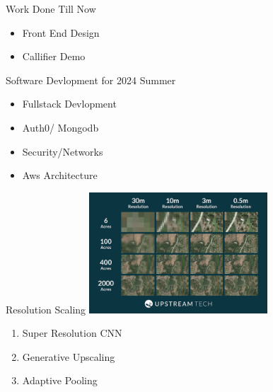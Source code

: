 

\begin{frame}{Work Done Till Now}
    \begin{itemize}
        \item Front End Design 
        \item Callifier Demo 
    \end{itemize}
\end{frame}


\begin{frame}{Software Devlopment for 2024 Summer}
    \begin{itemize}
        \item Fullstack Devlopment
        \item Auth0/ Mongodb
        \item Security/Networks
        \item Aws Architecture
    \end{itemize}
\end{frame}



\begin{frame}{Resolution Scaling}
    \includegraphics[height=0.5\textheight,width=0.5\textwidth,keepaspectratio]{images/mm_ml/Resolutions.png}
    \begin{enumerate}
        \item Super Resolution CNN 
        \item Generative Upscaling
        \item Adaptive Pooling
    \end{enumerate}
\end{frame}


